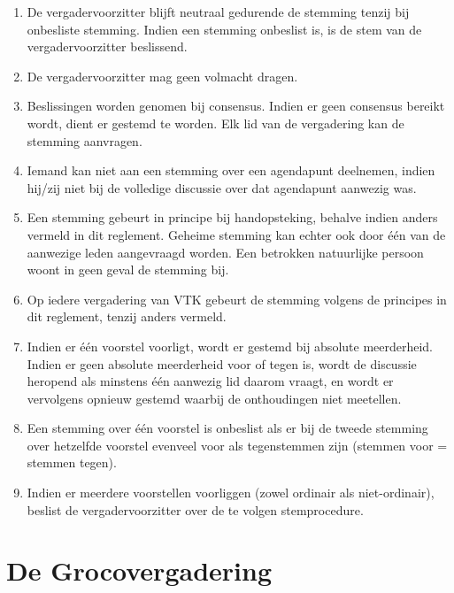     \begin{enumerate}
    \item De vergadervoorzitter blijft neutraal gedurende de stemming tenzij bij onbesliste stemming. Indien een stemming onbeslist is, is de stem van de vergadervoorzitter beslissend.
    \item De vergadervoorzitter mag geen volmacht dragen.
    \item Beslissingen worden genomen bij consensus. Indien er geen consensus bereikt wordt, dient er gestemd te worden. Elk lid van de vergadering kan de stemming aanvragen.
    \item Iemand kan niet aan een stemming over een agendapunt deelnemen, indien hij/zij niet bij de volledige discussie over dat agendapunt aanwezig was.
    \item Een stemming gebeurt in principe bij handopsteking, behalve indien anders vermeld in dit reglement. Geheime stemming kan echter ook door \'e\'en van de aanwezige leden aangevraagd worden. Een betrokken natuurlijke persoon woont in geen geval de stemming bij.
    \item Op iedere vergadering van VTK gebeurt de stemming volgens de principes in dit reglement, tenzij anders vermeld.
    \item Indien er \'e\'en voorstel voorligt, wordt er gestemd bij absolute meerderheid. Indien er geen absolute meerderheid voor of tegen is, wordt de discussie heropend als minstens \'e\'en aanwezig lid daarom vraagt, en wordt er vervolgens opnieuw gestemd waarbij de onthoudingen niet meetellen.
    \item Een stemming over \'e\'en voorstel is onbeslist als er bij de tweede stemming over hetzelfde voorstel evenveel voor als tegenstemmen zijn (stemmen voor = stemmen tegen).
    \item Indien er meerdere voorstellen voorliggen (zowel ordinair als niet-ordinair), beslist de vergadervoorzitter over de te volgen stemprocedure.
    \end{enumerate}

\section{De Grocovergadering}

